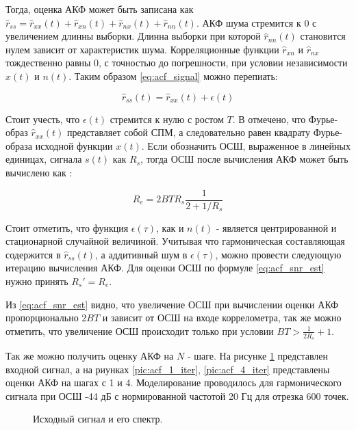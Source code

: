 Тогда, оценка АКФ может быть записана как
${\hat{r}_{ss}=\hat{r}_{xx}(t)+\hat{r}_{xn}(t)+\hat{r}_{nx}(t) + \hat{r}_{nn}(t)}$.
АКФ шума стремится к 0 с увеличением длинны выборки. Длинна выборки при которой ${\hat{r}_{nn}(t)}$ становится нулем зависит от характеристик шума.
Корреляционные функции ${\hat{r}_{xn}}$ и ${\hat{r}_{nx}}$ тождественно равны 0, с точностью до погрешности, при условии независимости
${x(t)}$ и ${n(t)}$. Таким образом \ref{eq:acf_signal} можно перепиать:
\begin{center}
\begin{equation}
	\label{eq:acf_rss_signal_new}
	\hat{r}_{ss}(t) = \hat{r}_{xx}(t) + \epsilon (t)
\end{equation}
\end{center}
Стоит учесть, что ${\epsilon (t)}$ стремится к нулю с ростом ${T}$. В \cite{ostanin_akf} отмечено, что Фурье-образ ${\hat{r}_{xx}(t)}$
представляет собой СПМ, а следовательно равен квадрату Фурье-образа исходной функции ${x(t)}$.
Если обозначить ОСШ, выраженное в линейных единицах, сигнала ${s(t)}$ как ${R_s}$, тогда ОСШ после вычисления АКФ может быть вычислено
как \cite{book_max}:
\begin{center}
\begin{equation}
	\label{eq:acf_snr_est}
	R_e=2BTR_s \frac{1}{2+1/R_s}
\end{equation}
\end{center}

Стоит отметить, что функция ${\epsilon(\tau)}$, как и ${n(t)}$ - является центрированной и
стационарной случайной величиной.
Учитывая что гармоническая составляющая содержится в ${\hat{r}_{ss}(t)}$, а аддитивный шум в ${\epsilon(\tau)}$, можно провести
следующую итерацию вычисления АКФ. Для оценки ОСШ по формуле \ref{eq:acf_snr_est} нужно принять ${R_s' = R_e}$.

Из \ref{eq:acf_snr_est} видно, что увеличение ОСШ при вычислении оценки АКФ пропорционально ${2BT}$ и зависит от
ОСШ на входе коррелометра, так же можно отметить, что увеличение ОСШ происходит только при условии ${BT > \frac{1}{2R_s} + 1}$.

Так же можно получить оценку АКФ на ${N}$ - шаге. На рисунке \ref{pic:acf_0_iter} представлен входной сигнал, а на
риунках \ref{pic:acf_1_iter}, \ref{pic:acf_4_iter} представлены оценки АКФ на шагах с 1 и 4.
Моделирование проводилось для гармонического сигнала при ОСШ -44 дБ с нормированной частотой 20 Гц для
отрезка 600 точек.

\begin{figure}[H]
	\center{}
	\caption{Исходный сигнал и его спектр.}
	\label{pic:acf_0_iter}
\end{figure}

